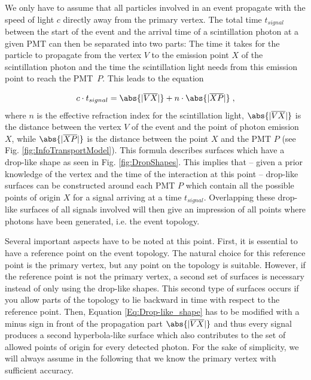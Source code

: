   We only have to assume that all particles involved in an event propagate with the speed 
  of light $c$ directly away from the primary vertex. The total time $t_{signal}$ between the start of the event and the arrival
  time of a scintillation photon at a given PMT can then be separated into two parts: 
  The time it takes for the particle to propagate from the vertex $V$ to the emission point $X$ of the scintillation photon and the
  time the scintillation light needs from this emission point to reach the PMT~$P$. This leads to the equation


 \begin{equation}
   \label{Eq:Drop-like_shape}
  c \cdot t_{signal} = \abs{|\overline{VX}|} + n \cdot \abs{|\overline{XP}|} \; ,
 \end{equation}
%
  where
  $n$ is the effective refraction index for the scintillation light, $\abs{|\overline{VX}|}$ is the distance between the vertex $V$ of 
  the event and the point of photon emission $X$, while $\abs{|\overline{XP}|}$ is the distance between the point $X$ and the PMT $P$ (see Fig. \ref{fig:InfoTransportModel}). This 
  formula describes surfaces which have a drop-like shape as seen in Fig. \ref{fig:DropShapes}. This implies that -- given a prior knowledge of 
  the vertex and the time of the interaction at this point -- drop-like surfaces can be constructed around each PMT $P$ which contain 
  all the possible points of origin $X$ for a signal arriving at a time $t_{signal}$. Overlapping these drop-like surfaces of all signals
  involved will then give an impression of all points where photons have been generated, i.e. the event topology. 
  
  Several important aspects have to be noted at this point. First, it is essential to have a reference point on the event topology. The natural
  choice for this reference point is the primary vertex, but any point on the topology is suitable. However, if the reference point is 
  not the primary vertex, a second set of surfaces is necessary instead of only using the drop-like shapes. This second type of surfaces 
  occurs if you allow parts of the topology to lie backward in time with respect to the reference point. Then, Equation \ref{Eq:Drop-like_shape}
  has to be modified with a minus sign in front of the propagation part $\abs{|\overline{VX}|}$ and thus every signal produces a 
  second hyperbola-like surface which also contributes to the set of allowed points of origin for every detected photon. For the sake 
  of simplicity, we will always assume in the following that we know the primary vertex with sufficient accuracy. 
  

